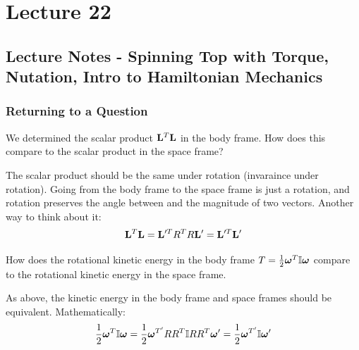 \documentclass[../PHYS306Notes.tex]{subfiles}
\begin{document}
\section{Lecture 22}
\subsection{Lecture Notes - Spinning Top with Torque, Nutation, Intro to Hamiltonian Mechanics}
\subsubsection{Returning to a Question}
We determined the scalar product $\mathbf{L}^T\mathbf{L}$ in the body frame. How does this compare to the scalar product in the space frame?
\begin{s}
The scalar product should be the same under rotation (invaraince under rotation). Going from the body frame to the space frame is just a rotation, and rotation preserves the angle between and the magnitude of two vectors. Another way to think about it:
\[\mathbf{L}^T\mathbf{L} = \mathbf{L}'^TR^TR\mathbf{L}' = \mathbf{L}'^T\mathbf{L}'\]
\end{s}
How does the rotational kinetic energy in the body frame $T = \frac{1}{2}\bm{\omega}^T\mathbb{I}\bm{\omega}$ compare to the rotational kinetic energy in the space frame.
\begin{s}
As above, the kinetic energy in the body frame and space frames should be equivalent. Mathematically:
\[\frac{1}{2}\bm{\omega}^T\mathbb{I}\bm{\omega} = \frac{1}{2}\bm{\omega}^{T'}RR^T\mathbb{I} RR^T\bm{\omega}' = \frac{1}{2}\bm{\omega}^{T'}\mathbb{I}\bm{\omega}'\]
\end{s}
\end{document}
